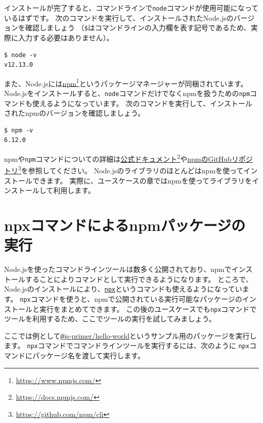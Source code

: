 インストールが完了すると、コマンドラインで\texttt{node}コマンドが使用可能になっているはずです。
次のコマンドを実行して、インストールされたNode.jsのバージョンを確認しましょう
（\texttt{\$}はコマンドラインの入力欄を表す記号であるため、実際に入力する必要はありません）。

\begin{lstlisting}
$ node -v
v12.13.0
\end{lstlisting}

また、Node.jsには\href{https://www.npmjs.com/}{npm}\footnote{\url{https://www.npmjs.com/}}というパッケージマネージャーが同梱されています。
Node.jsをインストールすると、\texttt{node}コマンドだけでなくnpmを扱うための\texttt{npm}コマンドも使えるようになっています。
次のコマンドを実行して、インストールされたnpmのバージョンを確認しましょう。

\begin{lstlisting}
$ npm -v
6.12.0
\end{lstlisting}

npmや\texttt{npm}コマンドについての詳細は\href{https://docs.npmjs.com/}{公式ドキュメント}\footnote{\url{https://docs.npmjs.com/}}や\href{https://github.com/npm/cli}{npmのGitHubリポジトリ}\footnote{\url{https://github.com/npm/cli}}を参照してください。
Node.jsのライブラリのほとんどはnpmを使ってインストールできます。
実際に、ユースケースの章ではnpmを使ってライブラリをインストールして利用します。

\hypertarget{npx-execution}{%
\section{npxコマンドによるnpmパッケージの実行}\label{npx-execution}}

Node.jsを使ったコマンドラインツールは数多く公開されており、npmでインストールすることによりコマンドとして実行できるようになります。
ところで、Node.jsのインストールにより、\href{https://blog.npmjs.org/post/162869356040/introducing-npx-an-npm-package-runner}{\texttt{npx}}というコマンドも使えるようになっています。
\texttt{npx}コマンドを使うと、npmで公開されている実行可能なパッケージのインストールと実行をまとめてできます。
この後のユースケースでも\texttt{npx}コマンドでツールを利用するため、ここでツールの実行を試してみましょう。

ここでは例として\href{https://github.com/js-primer/hello-world}{\texttt @js-primer/hello-world}というサンプル用のパッケージを実行します。
\texttt{npx}コマンドでコマンドラインツールを実行するには、次のように
\texttt{npx}コマンドにパッケージ名を渡して実行します。

